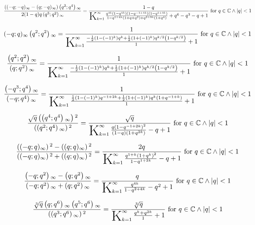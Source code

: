 \documentclass{article}
\newcommand{\bigK}{\mathop{\raisebox{-5pt}{\huge K}}}
\begin{document}
\[\frac{\left((-q;-q)_{\infty }-(q;-q)_{\infty }\right) \left(q^2;q^4\right){}_{\infty }}{2 (1-q) q \left(q^3;q^2\right){}_{\infty }}=\frac{1-q}{\bigK_{k=1}^{\infty}\frac{q^{4 k} \left(1-q^{4 k}\right) \left(1-q^{-1+4 k}\right) \left(1-q^{1+4 k}\right)}{1-q^{1+4 k} \left(1+q+q^2\right)+q^{2+8 k} \left(1+q^4\right)}+q^6-q^3-q+1}\text{ for }q\in \mathbb{C}\land \left| q\right| <1\] 

\[(-q;q)_{\infty } \left(q^2;q^2\right){}_{\infty }=\frac{1}{\bigK_{k=1}^{\infty}\frac{-\frac{1}{2} \left(1-(-1)^k\right) q^k+\frac{1}{2} \left(1+(-1)^k\right) q^{k/2} \left(1-q^{k/2}\right)}{1}+1}\text{ for }q\in \mathbb{C}\land \left| q\right| <1\] 

\[\frac{\left(q^2;q^2\right){}_{\infty }}{\left(q;q^2\right){}_{\infty }}=\frac{1}{\bigK_{k=1}^{\infty}\frac{-\frac{1}{2} \left(1-(-1)^k\right) q^k+\frac{1}{2} \left(1+(-1)^k\right) q^{k/2} \left(1-q^{k/2}\right)}{1}+1}\text{ for }q\in \mathbb{C}\land \left| q\right| <1\] 

\[\frac{\left(-q^3;q^4\right){}_{\infty }}{\left(-q;q^4\right){}_{\infty }}=\frac{1}{\bigK_{k=1}^{\infty}\frac{\frac{1}{2} \left(1-(-1)^k\right) q^{-1+2 k}+\frac{1}{2} \left(1+(-1)^k\right) q^k \left(1+q^{-1+k}\right)}{1}+1}\text{ for }q\in \mathbb{C}\land \left| q\right| <1\] 

\[\frac{\sqrt{q} \left(\left(q^4;q^4\right){}_{\infty }\right){}^2}{\left(\left(q^2;q^4\right){}_{\infty }\right){}^2}=\frac{\sqrt{q}}{\bigK_{k=1}^{\infty}\frac{q \left(1-q^{-1+2 k}\right)^2}{(1-q) \left(1+q^{2 k}\right)}-q+1}\text{ for }q\in \mathbb{C}\land \left| q\right| <1\] 

\[\frac{\left((-q;q)_{\infty }\right){}^2-\left((q;q)_{\infty }\right){}^2}{\left((-q;q)_{\infty }\right){}^2+\left((q;q)_{\infty }\right){}^2}=\frac{2 q}{\bigK_{k=1}^{\infty}\frac{q^{1+k} \left(1+q^k\right)^2}{1-q^{1+2 k}}-q+1}\text{ for }q\in \mathbb{C}\land \left| q\right| <1\] 

\[\frac{\left(-q;q^2\right){}_{\infty }-\left(q;q^2\right){}_{\infty }}{\left(-q;q^2\right){}_{\infty }+\left(q;q^2\right){}_{\infty }}=\frac{q}{\bigK_{k=1}^{\infty}\frac{q^{4 k}}{1-q^{2+4 k}}-q^2+1}\text{ for }q\in \mathbb{C}\land \left| q\right| <1\] 

\[\frac{\sqrt[3]{q} \left(q;q^6\right){}_{\infty } \left(q^5;q^6\right){}_{\infty }}{\left(\left(q^3;q^6\right){}_{\infty }\right){}^2}=\frac{\sqrt[3]{q}}{\bigK_{k=1}^{\infty}\frac{q^k+q^{2 k}}{1}+1}\text{ for }q\in \mathbb{C}\land \left| q\right| <1\] 
\end{document}
